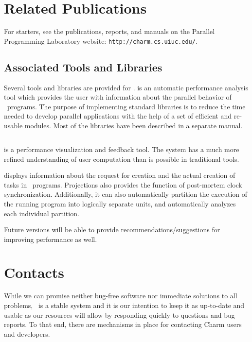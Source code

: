 \section{Related Publications}
\label{publications}

For starters, see the publications, reports, and manuals 
on the Parallel Programming Laboratory website: \texttt{http://charm.cs.uiuc.edu/}. 

\subsection{Associated Tools and Libraries}

Several tools and libraries are provided for \charmpp{}. \projections{} 
is an automatic performance analysis tool which provides
the user with information about the parallel behavior of \charmpp\ programs. 
The purpose of implementing \charmpp{} standard
libraries is to reduce the time needed to develop parallel
applications with the help of a set of efficient and re-usable modules.
Most of the libraries have been described in a separate manual.

\subsection{\projections}

\projections{} is a performance visualization and feedback tool. The system has
a much more refined understanding of user computation than is possible in
traditional tools.

\projections{} displays information about the request for creation and the
actual creation of tasks in \charmpp\ programs. Projections also provides the
function of post-mortem clock synchronization. Additionally, it can also
automatically partition the execution of the running program into logically
separate units, and automatically analyzes each individual partition. 

Future versions will be able to provide recommendations/suggestions for
improving performance as well.

\section{Contacts}
\label{Distribution}

While we can promise neither bug-free software nor immediate solutions   
to all problems, \charmpp\ is a stable system and it is our intention to
keep it as up-to-date and usable as our resources will allow
by responding quickly to questions and bug reports.  To that
end, there are mechanisms in place for contacting Charm users
and developers. 

